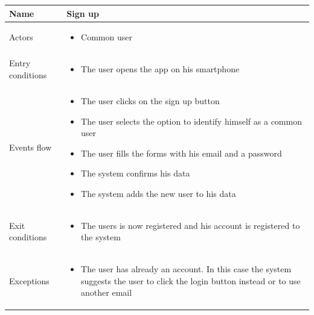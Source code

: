 \documentclass[a4paper]{article}
\begin{document}
\begin{table}[H]
\centering
\begin{tabularx}{\textwidth}{|l|X|}
\hline
Name & Sign up\tabularnewline
\hline
Actors &
\begin{itemize}[nosep,leftmargin=*]
\item Common user
\end{itemize}
\tabularnewline
\hline
Entry conditions &
\begin{itemize}[nosep,leftmargin=*]
\item The user opens the app on his smartphone
\end{itemize}
\tabularnewline
\hline
Events flow &
\begin{itemize}[nosep,leftmargin=*]
\item The user clicks on the sign up button
\item The user selects the option to identify himself as a common user
\item The user fills the forms with his email and a password
\item The system confirms his data
\item The system adds the new user to his data
\end{itemize}
\tabularnewline
\hline
Exit conditions &
\begin{itemize}[nosep,leftmargin=*]
\item The users is now registered and his account is registered to the
system
\end{itemize}
\tabularnewline
\hline
Exceptions &
\begin{itemize}[nosep,leftmargin=*]
\item The user has already an account. In this case the system suggests
the user to click the login button instead or to use another email
\end{itemize}
\tabularnewline
\hline
\end{tabularx}
\end{table}
\end{document}
